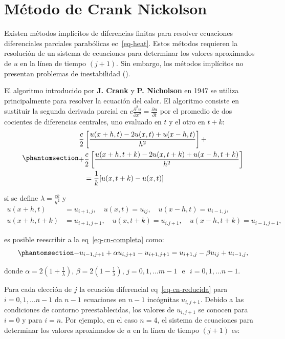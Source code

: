 \documentclass[
  spanish,
  us-letterpaper,
  DIV=11,
  numbers=noendperiod]{scrreprt}
\theoremstyle{plain}
\theoremstyle{definition}
\theoremstyle{remark}
\begin{document}
\chapter{Método de Crank Nickolson}\label{muxe9todo-de-crank-nickolson}

Existen métodos implícitos de diferencias finitas para resolver
ecuaciones diferenciales parciales parabólicas ec~\ref{eq-heat}. Estos
métodos requieren la resolución de un sistema de ecuaciones para
determinar los valores aproximados de \(u\) en la línea de tiempo
\((j + 1)\). Sin embargo, los métodos implícitos no presentan problemas
de inestabilidad ().

El algoritmo introducido por \textbf{J. Crank} y \textbf{P. Nicholson}
en 1947 se utiliza principalmente para resolver la ecuación del calor.
El algoritmo consiste en sustituir la segunda derivada parcial en
\(c\frac{\partial^2 u}{\partial x^2} = \frac{\partial u}{\partial t}\)
por el promedio de dos cocientes de diferencias centrales, uno evaluado
en \(t\) y el otro en \(t+k\):
\begin{equation}\phantomsection\label{eq-cn-completa}{
\begin{split}
\dfrac{c}{2}& \left[\dfrac{u(x+h,t)-2u(x,t)+u(x-h,t)}{h^2}\right] + \\
    + &\dfrac{c}{2} \left[\dfrac{u(x+h,t+k)-2u(x,t+k)+u(x-h,t+k)}{h^2} \right] \\
            &= \dfrac{1}{k}[u(x,t+k)-u(x,t)]
\end{split}
}\end{equation}

si se define \(\lambda = \frac{ck}{h^2}\) y \[
\begin{split}
u(x+h,t) &=u_{i+1,j}, \quad u(x,t)=u_{ij}, \quad u(x-h,t)=u_{i-1,j}, \\
u(x+h,t+k) &=u_{i+1,j+1}, \quad u(x,t+k)=u_{i.j+1}, \quad u(x-h,t+k)=u_{i-1,j+1},
\end{split}
\]

es posible reescribir a la eq~\ref{eq-cn-completa} como:
\begin{equation}\phantomsection\label{eq-cn-reducida}{
-u_{i-1,j+1} + \alpha u_{i,j+1} - u_{i+1,j+1} = u_{i+1,j} - \beta u_{ij} + u_{i-1,j},
}\end{equation}

donde \(\alpha=2(1+\frac{1}{\lambda})\),
\(\beta=2(1-\frac{1}{\lambda})\),
\(j=0,1,\dots m-1 \ \ \ \text{e} \ \ \ i=0,1,\dots n-1\).

Para cada elección de \(j\) la ecuación diferencial
eq~\ref{eq-cn-reducida} para \(i=0,1,\dots n-1\) da \(n-1\) ecuaciones
en \(n-1\) incógnitas \(u_{i,j+1}\). Debido a las condiciones de
contorno preestablecidas, los valores de \(u_{i, j+1}\) se conocen para
\(i=0\) y para \(i=n\). Por ejemplo, en el caso \(n=4\), el sistema de
ecuaciones para determinar los valores aproximados de \(u\) en la línea
de tiempo \((j+1)\) es:
\end{document}
